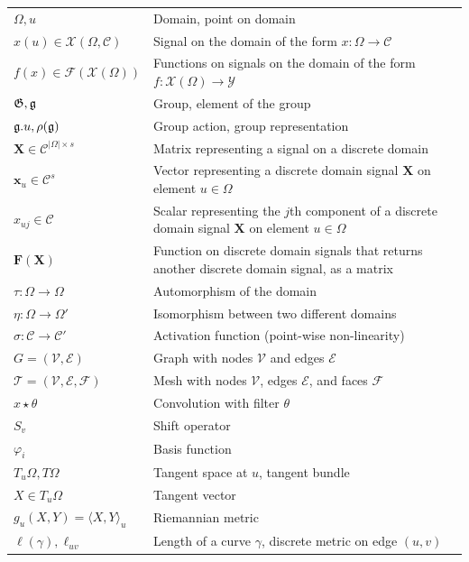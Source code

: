 \documentclass[11pt]{book}              %
\renewcommand\vec{\mathbf}
\begin{document}
\begin{minipage}{\textwidth}
\def\arraystretch{1.5}
\begin{tabular}{lp{3.25in}}
$\Omega,u$ & Domain, point on domain\\
$x(u) \in \mathcal{X}(\Omega,\mathcal{C})$ & Signal on the domain of the form $x:\Omega\rightarrow \mathcal{C}$\\
$f(x) \in \mathcal{F}(\mathcal{X}(\Omega))$ & Functions on signals on the domain of the form $f:\mathcal{X}(\Omega) \rightarrow \mathcal{Y}$\\
%
${\mathfrak{G}},{\mathfrak{g}}$ & Group, element of the group\\
${\mathfrak{g}}.u, \rho({\mathfrak{g}})$ & Group action, group representation\\
%
$\vec{X}\in\mathcal{C}^{|\Omega|\times s}$ & Matrix representing a signal on a discrete domain\\
$\vec{x}_u\in\mathcal{C}^{s}$ & Vector representing a discrete domain signal $\vec{X}$ on element $u\in\Omega$\\
$x_{uj}\in\mathcal{C}$ & Scalar representing the $j$th component of a discrete domain signal $\vec{X}$ on element $u\in\Omega$\\
$\vec{F}(\vec{X})$ & Function on discrete domain signals that returns another discrete domain signal, as a matrix\\
%
$\tau:\Omega\rightarrow\Omega$ & Automorphism of the domain \\
$\eta:\Omega\rightarrow\Omega'$ & Isomorphism between two different domains \\
$\sigma: \mathcal{C}\rightarrow\mathcal{C}'$ & Activation function (point-wise non-linearity)\\
%
$G=(\mathcal{V},\mathcal{E})$ & Graph with nodes $\mathcal{V}$ and edges $\mathcal{E}$ \\
$\mathcal{T}=(\mathcal{V},\mathcal{E},\mathcal{F})$ & Mesh with nodes $\mathcal{V}$,  edges $\mathcal{E}$, and faces $\mathcal{F}$ \\
%
$x\star \theta$ & Convolution with filter $\theta$ \\
$S_v$ & Shift operator \\
%
$\varphi_i$ & Basis function \\
%
%
$T_u\Omega, T\Omega$ & Tangent space at $u$, tangent bundle \\
$X \in T_u\Omega$ & Tangent vector\\
$g_u(X,Y) = \langle X, Y\rangle_u$ & Riemannian metric\\
%
$\ell(\gamma), \ell_{uv}$ & Length of a curve $\gamma$, discrete metric on edge $(u,v)$ \\

\end{tabular}
\end{minipage}
\pagebreak





\end{document}
